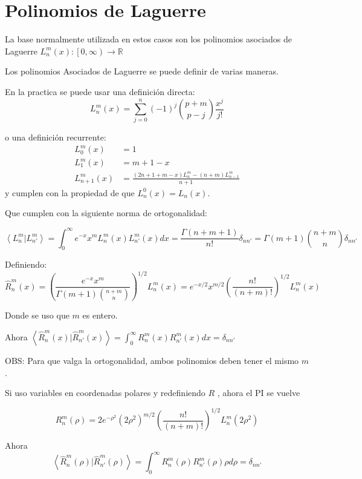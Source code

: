 \section{Polinomios de Laguerre}
			
		La base normalmente utilizada en estos casos son los polinomios asociados de Laguerre $L^m_n(x): \left[ 0, \infty \right) \longrightarrow \mathbb{R}$
		
		Los polinomios Asociados de Laguerre se puede definir de varias maneras.
	
			
		En la practica se puede usar una definición directa:
		\[  L_n^m(x)=\sum_{j=0}^{n}(-1)^j \binom{p+m}{p-j}\frac{x^j}{j!} \]
		
		o una definición recurrente:
		\begin{align*}
			L^m_0(x) &= 1 \\
			L^m_1(x) &= m+1-x\\
			L^m_{n+1}(x) &= \frac{(2n+1+m-x)L_n^m-(n+m)L_{n-1}^m}{n+1}
		\end{align*}
		y cumplen con la propiedad de que $L_n^0(x)=L_n(x)$.
		
		Que cumplen con la siguiente norma de ortogonalidad:
		
		\[  \left \langle L_n^m | L_{n'}^{m} \right \rangle = \int_0^\infty e^{-x} x^{m} L_n^m(x) L_{n'}^{m}(x) dx = \frac{\Gamma(n+m+1)}{n!} \delta_{nn'}=\Gamma(m+1){n+m \choose n} \delta_{nn'} 
		\]
		\label{PI}
		
		Definiendo: 
		$\hat{R}_n^m(x)=(\dfrac{e^{-x} x^{m}}{\Gamma(m+1){n+m \choose n}})^{1/2}  L_n^m(x)=e^{-x/2} x^{m/2}(\dfrac{n!}{(n+m)!})^{1/2}  L_n^m(x)$
		
		Donde se uso que $m$ es entero.
		
		Ahora $\left \langle \hat{R}_n^m(x) | \hat{R}_{n'}^{m}(x) \right \rangle = \int_0^\infty R_n^m(x) R_{n'}^{m}(x) dx = \delta_{nn'} $
		
		OBS: Para que valga la ortogonalidad, ambos polinomios deben tener el mismo $m$.
		
		Si uso variables en coordenadas polares y redefiniendo $R$ , ahora el PI se vuelve
		
		\[R_n^m(\rho)=2e^{-\rho^2} (2\rho^2)^{m/2}(\dfrac{n!}{(n+m)!})^{1/2}  L_n^m(2\rho^2) \]
		
		Ahora
		\[\left \langle \hat{R}_n^m(\rho) | \hat{R}_{n'}^{m}(\rho) \right \rangle = \int_0^\infty R_n^m(\rho) R_{n'}^{m}(\rho) \rho d\rho = \delta_{nn'}
		\] 
		
